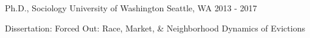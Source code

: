 

\begin{cventries}


  \cventry
    {Ph.D., Sociology} %
    {University of Washington} %
    {Seattle, WA} %
    {2013 - 2017} %
    {
      \begin{cvitems} %
        \item {Dissertation: Forced Out: Race, Market, & Neighborhood Dynamics of Evictions}
      \end{cvitems}
    }


\end{cventries}
